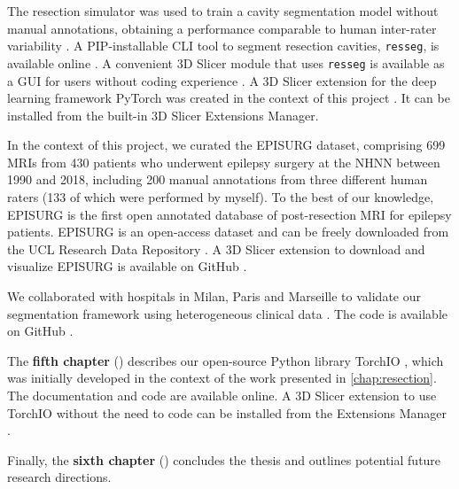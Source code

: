 The resection simulator was used to train a cavity segmentation model without manual annotations, obtaining a performance comparable to human inter-rater variability \cite{perez-garcia_simulation_2020}.
A \ac{PIP}-installable \ac{CLI} tool to segment resection cavities, \texttt{resseg}, is available online%
.
A convenient 3D Slicer module that uses \texttt{resseg} is available as a \ac{GUI} for users without coding experience%
.
A 3D Slicer extension for the deep learning framework PyTorch was created in the context of this project%
.
It can be installed from the built-in 3D Slicer Extensions Manager.

In the context of this project, we curated the EPISURG dataset, comprising 699 \acp{MRI} from 430 patients who underwent epilepsy surgery at the \ac{NHNN} between 1990 and 2018, including 200 manual annotations from three different human raters (133 of which were performed by myself).
To the best of our knowledge, EPISURG is the first open annotated database of post-resection \ac{MRI} for epilepsy patients.
EPISURG is an open-access dataset and can be freely downloaded from the UCL Research Data Repository \cite{perez-garcia_episurg_2020}.
A 3D Slicer extension to download and visualize EPISURG is available on GitHub%
.

We collaborated with hospitals in Milan, Paris and Marseille to validate our segmentation framework using heterogeneous clinical data \cite{perez-garcia_self-supervised_2021}.
The code is available on GitHub%
.

The \textbf{fifth chapter} () describes our open-source Python  library TorchIO \cite{perez-garcia_torchio_2021}, which was initially developed in the context of the work presented in \cref{chap:resection}.
The documentation%
and code%
are available online.
A 3D Slicer extension to use TorchIO without the need to code can be installed from the Extensions Manager%
.


Finally, the \textbf{sixth chapter} () concludes the thesis and outlines potential future research directions.
